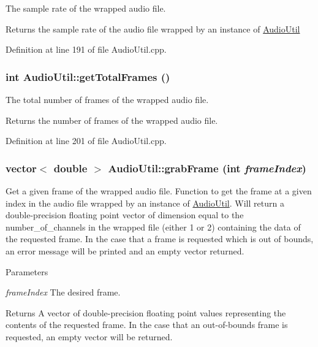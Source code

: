 The sample rate of the wrapped audio file. \begin{DoxyReturn}{Returns}
the sample rate of the audio file wrapped by an instance of \hyperlink{classAudioUtil}{AudioUtil} 
\end{DoxyReturn}


Definition at line 191 of file AudioUtil.cpp.\hypertarget{classAudioUtil_ad4d581baa08a44c7c5d2ee05f589dcf1}{
\subsubsection[{getTotalFrames}]{\setlength{\rightskip}{0pt plus 5cm}int AudioUtil::getTotalFrames ()}}
\label{classAudioUtil_ad4d581baa08a44c7c5d2ee05f589dcf1}


The total number of frames of the wrapped audio file. \begin{DoxyReturn}{Returns}
the number of frames of the wrapped audio file. 
\end{DoxyReturn}


Definition at line 201 of file AudioUtil.cpp.\hypertarget{classAudioUtil_a6aa717262c503b4c6b238fdebdc1d1ca}{
\subsubsection[{grabFrame}]{\setlength{\rightskip}{0pt plus 5cm}vector$<$ double $>$ AudioUtil::grabFrame (int {\em frameIndex})}}
\label{classAudioUtil_a6aa717262c503b4c6b238fdebdc1d1ca}


Get a given frame of the wrapped audio file. Function to get the frame at a given index in the audio file wrapped by an instance of \hyperlink{classAudioUtil}{AudioUtil}. Will return a double-\/precision floating point vector of dimension equal to the number\_\-of\_\-channels in the wrapped file (either 1 or 2) containing the data of the requested frame. In the case that a frame is requested which is out of bounds, an error message will be printed and an empty vector returned.


\begin{DoxyParams}{Parameters}
\item[{\em frameIndex}]The desired frame.\end{DoxyParams}
\begin{DoxyReturn}{Returns}
A vector of double-\/precision floating point values representing the contents of the requested frame. In the case that an out-\/of-\/bounds frame is requested, an empty vector will be returned. 
\end{DoxyReturn}


